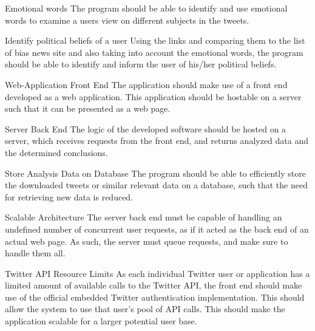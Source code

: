 \begin{requirement}{Emotional  words}
The program should be able to identify and use emotional words to examine a
users view on different subjects in the tweets. 
\end{requirement}

\begin{requirement}{Identify political beliefs of a user }
Using the links and comparing them to the list of bias news site and also taking
into account the emotional words, the program should be able to identify and
inform the user of his/her political beliefs. 
\end{requirement}

\begin{requirement}{Web-Application Front End}
The application should make use of a front end developed as a web application.
This application should be hostable on a server such that it can be presented as
a web page.
\end{requirement}

\begin{requirement}{Server Back End}
The logic of the developed software should be hosted on a server, which receives
requests from the front end, and returns analyzed data and the determined
conclusions.
\end{requirement}

\begin{requirement}{Store Analysis Data on Database}
The program should be able to efficiently store the downloaded tweets or
similar relevant data on a database, such that the need for retrieving new data
is reduced.
\end{requirement}

\begin{requirement}{Scalable Architecture}
The server back end must be capable of handling an undefined number of
concurrent user requests, as if it acted as the back end of an actual web page. As such,
the server must queue requests, and make sure to handle them all.
\end{requirement}

\begin{requirement}{Twitter API Resource Limits}
As each individual Twitter user or application has a limited amount of available
calls to the Twitter API, the front end should make use of the official
embedded Twitter authentication implementation. This should allow the system to
use that user's pool of API calls. This should make the application scalable for
a larger potential user base.
\end{requirement}

